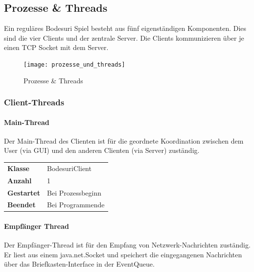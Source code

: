 \documentclass[12pt,halfparskip]{scrartcl}
\begin{document}
\clearpage

\subsection{Prozesse \& Threads} %
\label{sub:prozesse_threads}

Ein reguläres Bodesuri Spiel besteht aus fünf eigenständigen Komponenten. Dies sind die vier Clients und der zentrale Server. Die Clients kommunizieren über je einen TCP Socket mit dem Server.

\begin{figure}[h]
	\centering
	\texttt{[image: prozesse\_und\_threads]}
	\caption{Prozesse \& Threads}
	\label{fig:prozesse_und_threads}
\end{figure}

\subsubsection{Client-Threads} %
\label{ssub:client_threads}


\paragraph{Main-Thread} %
\label{ssub:main_thread}

Der Main-Thread des Clienten ist für die geordnete Koordination zwischen dem User (via GUI) und den anderen Clienten (via Server) zuständig.


\begin{tabular}{@{} l p{12.5cm}}
\textbf{Klasse}       & BodesuriClient \\
\textbf{Anzahl}       & 1 \\
\textbf{Gestartet}    & Bei Prozessbeginn \\
\textbf{Beendet}      & Bei Programmende
\end{tabular}


\paragraph{Empfänger Thread} %
\label{ssub:empfänger_thread}

Der Empfänger-Thread ist für den Empfang von Netzwerk-Nachrichten zuständig. Er liest aus einem java.net.Socket und speichert die eingegangenen Nachrichten über das Briefkasten-Interface in der EventQueue.
\end{document}
